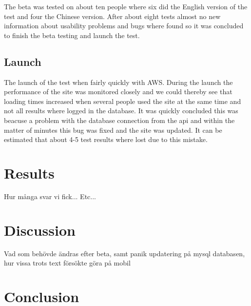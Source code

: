 The beta was tested on about ten people where six did the English version of the test and four the Chinese version. After about eight tests almost no new information about usability problems and bugs where found so it was concluded to finish the beta testing and launch the test.

\subsection{Launch}
The launch of the test when fairly quickly with AWS. During the launch the performance of the site was monitored closely and we could thereby see that loading times increased when several people used the site at the same time and not all results where logged in the database. It was quickly concluded this was beacuse a problem with the database connection from the api and within the matter of minutes this bug was fixed and the site was updated. It can be estimated that about 4-5 test results where lost due to this mistake.

\section{Results}
Hur många svar vi fick... Etc...

\section{Discussion}
Vad som behövde ändras efter beta, samt panik updatering på mysql databasen, hur vissa trots text försökte göra på mobil


\section{Conclusion}
